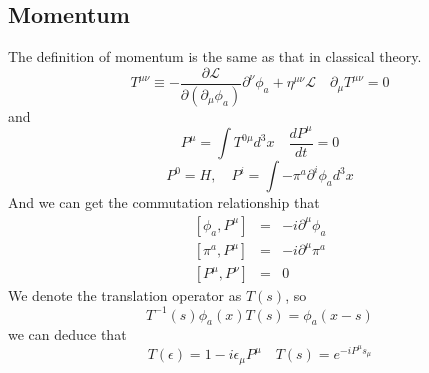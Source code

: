 \documentclass{article}
\begin{document}
\subsection{Momentum}
The definition of momentum is the same as that in classical theory.
\[T^{\mu \nu} \equiv -\frac{\partial \mathcal{L}}{\partial(\partial_{\mu}\phi_a)} \partial^{\nu} \phi_a + \eta^{\mu \nu} \mathcal{L} \quad \partial_{\mu} T^{\mu \nu} = 0\]
and
\[P^{\mu} = \int T^{0 \mu} d^3 x \quad \frac{d P^{\mu}}{dt} = 0\]
\[P^{0} = H, \quad P^{i} = \int -\pi^a \partial^i \phi_a d^3 x\]
And we can get the commutation relationship that
\begin{eqnarray}
\left[\phi_a,P^{\mu}\right] &=& -i\partial^{\mu} \phi_a \nonumber \\
\left[\pi^a,P^{\mu}\right] &=& -i\partial^{\mu} \pi^a \nonumber \\
\left[P^{\mu},P^{\nu}\right] &=& 0 \nonumber 
\end{eqnarray}
We denote the translation operator as $T(s)$, so
\[T^{-1}(s) \phi_a(x) T(s) = \phi_a(x-s)\]
we can deduce that
\[T(\epsilon) = 1 - i\epsilon_{\mu} P^{\mu} \quad T(s) = e^{-iP^{\mu}s_{\mu}}\]
\end{document}
